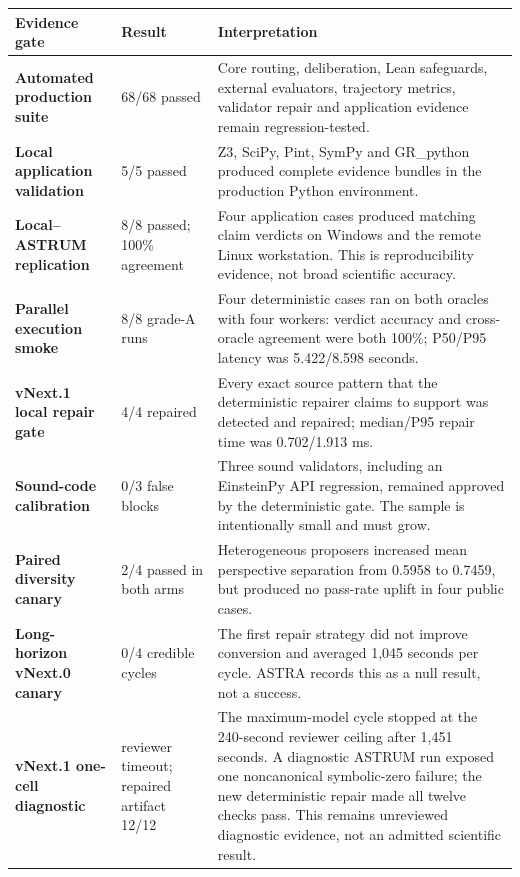\documentclass[10pt,a4paper]{article}
\begin{document}
\begin{tabularx}{\textwidth}{@{}>{\bfseries\color{navy}}p{3.2cm} p{2.7cm} Y@{}}
\toprule
Evidence gate & Result & Interpretation \\
\midrule
Automated production suite & 68/68 passed &
Core routing, deliberation, Lean safeguards, external evaluators, trajectory metrics,
validator repair and application evidence remain regression-tested. \\
\addlinespace
Local application validation & 5/5 passed &
Z3, SciPy, Pint, SymPy and GR\_python produced complete evidence bundles in the
production Python environment. \\
\addlinespace
Local--ASTRUM replication & 8/8 passed; 100\% agreement &
Four application cases produced matching claim verdicts on Windows and the remote
Linux workstation. This is reproducibility evidence, not broad scientific accuracy. \\
\addlinespace
Parallel execution smoke & 8/8 grade-A runs &
Four deterministic cases ran on both oracles with four workers: verdict accuracy and
cross-oracle agreement were both 100\%; P50/P95 latency was 5.422/8.598 seconds. \\
\addlinespace
vNext.1 local repair gate & 4/4 repaired &
Every exact source pattern that the deterministic repairer claims to support was
detected and repaired; median/P95 repair time was 0.702/1.913 ms. \\
\addlinespace
Sound-code calibration & 0/3 false blocks &
Three sound validators, including an EinsteinPy API regression, remained approved by
the deterministic gate. The sample is intentionally small and must grow. \\
\addlinespace
Paired diversity canary & 2/4 passed in both arms &
Heterogeneous proposers increased mean perspective separation from 0.5958 to 0.7459,
but produced no pass-rate uplift in four public cases. \\
\addlinespace
Long-horizon vNext.0 canary & 0/4 credible cycles &
The first repair strategy did not improve conversion and averaged 1,045 seconds per
cycle. ASTRA records this as a null result, not a success. \\
\addlinespace
vNext.1 one-cell diagnostic & reviewer timeout; repaired artifact 12/12 &
The maximum-model cycle stopped at the 240-second reviewer ceiling after 1,451
seconds. A diagnostic ASTRUM run exposed one noncanonical symbolic-zero failure;
the new deterministic repair made all twelve checks pass. This remains unreviewed
diagnostic evidence, not an admitted scientific result. \\
\bottomrule
\end{tabularx}
\end{document}
